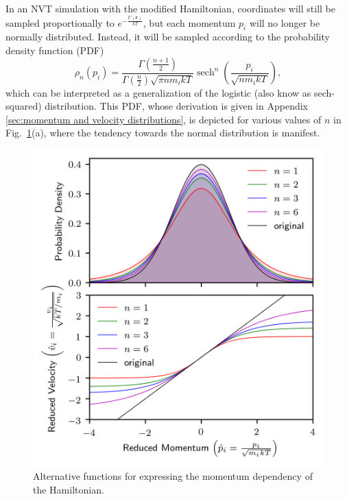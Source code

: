 \documentclass[
aip,
jcp,
reprint,
]{revtex4-1}
\DeclareMathOperator\sech{sech}
\newcommand{\vt}[1]{\boldsymbol{\mathbf{#1}}}          %
\begin{document}
In an NVT simulation with the modified Hamiltonian, coordinates will still be sampled proportionally to $e^{-\frac{U(\vt r)}{kT}}$, but each momentum $p_i$ will no longer be normally distributed.
Instead, it will be sampled according to the probability density function (PDF)
\begin{equation}
\label{eq:momentum distribution}
\rho_n(p_i) = \frac{\Gamma\left(\frac{n+1}{2}\right)}{\Gamma\left(\frac{n}{2}\right) \sqrt{\pi n m_i k T}} \sech^n\left(\frac{p_i}{\sqrt{n m_i k T}}\right),
\end{equation}
which can be interpreted as a generalization of the logistic (also know as sech-squared) distribution.
This PDF, whose derivation is given in Appendix \ref{sec:momentum and velocity distributions}, is depicted for various values of $n$ in Fig.~\ref{fig:hamiltonian momentum dependency}(a), where the tendency towards the normal distribution is manifest.

\begin{figure}
	\centering
	\includegraphics{momentum_functions}
	\caption{Alternative functions for expressing the momentum dependency of the Hamiltonian.}
	\label{fig:hamiltonian momentum dependency}
\end{figure}
\end{document}
